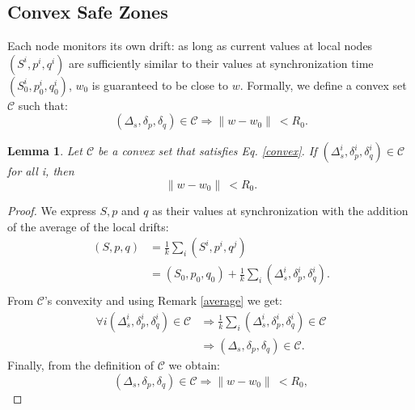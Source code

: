 \documentclass{sig-alternate-05-2015}
\newtheorem{lemma}{Lemma}
\begin{document}
\subsection{Convex Safe Zones}
Each node monitors its own drift: as long as current values
at local nodes $(S^i,p^i,q^i)$ are sufficiently similar to their values
at synchronization time $(S^i_0,p^i_0,q^i_0)$, $w_0$ is guaranteed to be close to $w$.
Formally, we define a convex set $\mathcal{C}$ such that:
\begin{equation} \label{convex}
(\Delta_s, \delta_p, \delta_q) \in \mathcal{C} \Rightarrow \parallel w-w_0
\parallel \ < R_0.
\end{equation}
\begin{lemma}
Let $\mathcal{C}$ be a convex set that satisfies Eq. \ref{convex}.
If $(\Delta_s^i, \delta_p^i, \delta_q^i) \in \mathcal{C}$ for all i, then
\begin{equation*}
\parallel w-w_0 \parallel \ < R_0.
\end{equation*}
\end{lemma}
\begin{proof}
We express $S, p$ and $q$ as their values at synchronization with the addition of the
average of the local drifts:
\begin{equation*}
\begin{split}
(S,p,q) & = \frac{1}{k} \sum_i (S^i,p^i,q^j) \\
 & = (S_0,p_0,q_0) + \frac{1}{k} \sum_i (\Delta_s^i,\delta^i_p,\delta_q^i). \\
\end{split}
\end{equation*}
From $\mathcal{C}$'s convexity and using Remark \ref{average} we get:
\begin{equation*}
\begin{split}
\forall i (\Delta_s^i,\delta^i_p,\delta_q^i) \in \mathcal{C} & \Rightarrow
\frac{1}{k} \sum_i (\Delta_s^i,\delta^i_p,\delta_q^i) \in \mathcal{C} \\
& \Rightarrow (\Delta_s,\delta_p,\delta_q) \in \mathcal{C}.
\end{split}
\end{equation*}
Finally, from the definition of $\mathcal{C}$ we obtain:
\begin{equation*}
(\Delta_s,\delta_p,\delta_q) \in \mathcal{C} \Rightarrow \parallel w-w_0
\parallel \ < R_0,
\end{equation*}
\end{proof}
\end{document}
